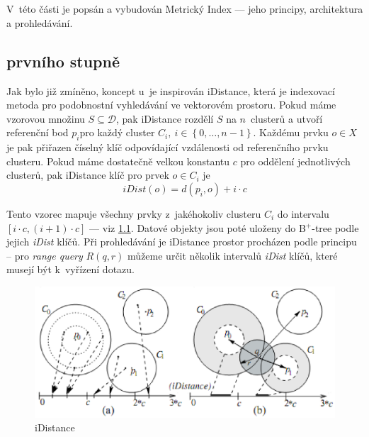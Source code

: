 \chapter{\MIndex}

V~této části je popsán a vybudován Metrický Index --- jeho principy,
architektura a prohledávání.

\section{\MIndex prvního stupně}

Jak bylo již zmíněno, koncept \MIndex u~je inspirován iDistance, která
je indexovací metoda pro podobnostní vyhledávání ve vektorovém prostoru.
Pokud máme vzorovou množinu $S\subseteq\mathbb{\mathcal{D}}$, pak
iDistance rozdělí $S$ na $n$~clusterů a utvoří referenční bod $p_{i}$pro
každý cluster $C_{i},\: i\in\left\{ 0,\ldots,n-1\right\} $. Každému
prvku $o\in X$ je pak přiřazen číselný klíč odpovídající vzdálenosti
od referenčního prvku clusteru. Pokud máme dostatečně velkou konstantu
$c$ pro oddělení jednotlivých clusterů, pak iDistance klíč pro prvek
$o\in C_{i}$ je
\[
iDist(o)=d(p_{i},o)+i\cdot c
\]


Tento vzorec mapuje všechny prvky z~jakéhokoliv clusteru $C_{i}$
do intervalu $[i\cdot c,(i+1)\cdot c]$ --- viz \ref{fig:iDistance}\@.
Datové objekty jsou poté uloženy do B$^{+}$-tree podle jejich \emph{iDist
}klíčů. Při prohledávání je iDistance prostor procházen podle principu
-- pro \emph{range query} $R(q,r)$ můžeme určit několik intervalů
\emph{iDist} klíčů, které musejí být k~vyřízení dotazu\@.

\begin{figure}[t]
\begin{centering}
\includegraphics[clip,scale=0.4]{idistance}
\par\end{centering}

\caption{iDistance\label{fig:iDistance}}
\end{figure}


